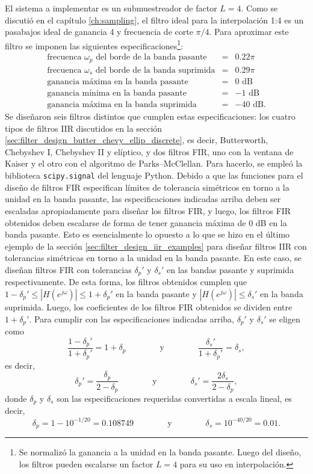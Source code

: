 \documentclass[a4paper]{report}
\begin{document}
El sistema a implementar es un submuestreador de factor \(L=4\). Como se discutió en el capítulo \ref{ch:sampling}, el filtro ideal para la interpolación 1:4 es un pasabajos ideal de ganancia 4 y frecuencia de corte \(\pi/4\). Para aproximar este filtro se imponen las siguientes especificaciones\footnote{Se normalizó la ganancia a la unidad en la banda pasante. Luego del diseño, los filtros pueden escalarse un factor \(L=4\) para su uso en interpolación.}:
\[
 \begin{array}{lclcr}
  \textrm{frecuenca }\omega_p\textrm{ del borde de la banda pasante} & = & 0.22\pi\\
  \textrm{frecuenca }\omega_s\textrm{ del borde de la banda suprimida} & = & 0.29\pi\\
  \textrm{ganancia máxima en la banda pasante} & = & 0\textrm{ dB}\\
  \textrm{ganancia mínima en la banda pasante} & = & -1\textrm{ dB}\\
  \textrm{ganancia máxima en la banda suprimida} & = & -40\textrm{ dB}.
 \end{array}
\]
Se diseñaron seis filtros distintos que cumplen estas especificaciones: los cuatro tipos de filtros IIR discutidos en la sección \ref{sec:filter_design_butter_chevy_ellip_discrete}, es decir, Butterworth, Chebyshev I, Chebyshev II y elíptico, y dos filtros FIR, uno con la ventana de Kaiser y el otro con el algoritmo de Parks--McClellan. Para hacerlo, se empleó la biblioteca \texttt{scipy.signal} del lenguaje Python. Debido a que las funciones para el diseño de filtros FIR especifican límites de tolerancia simétricos en torno a la unidad en la banda pasante, las especificaciones indicadas arriba deben ser escaladas apropiadamente para diseñar los filtros FIR, y luego, los filtros FIR obtenidos deben escalarse de forma de tener ganancia máxima de 0 dB en la banda pasante. Esto es esencialmente lo opuesto a lo que se hizo en el último ejemplo de la sección \ref{sec:filter_design_iir_examples} para diseñar filtros IIR con tolerancias simétricas en torno a la unidad en la banda pasante. En este caso, se diseñan filtros FIR con tolerancias \(\delta_p'\) y \(\delta_s'\) en las bandas pasante y suprimida respectivamente. De esta forma, los filtros obtenidos cumplen que \(1-\delta_p'\leq|H(e^{j\omega})|\leq1+\delta_p'\) en la banda pasante y \(|H(e^{j\omega})|\leq\delta_s'\) en la banda suprimida. Luego, los coeficientes de los filtros FIR obtenidos se dividen entre \(1+\delta_p'\). Para cumplir con las especificaciones indicadas arriba, \(\delta_p'\) y \(\delta_s'\) se eligen como
\[
 \frac{1-\delta_p'}{1+\delta_p'}=1+\delta_p
 \qquad\qquad\textrm{y}\qquad\qquad
 \frac{\delta_s'}{1+\delta_p'}=\delta_s,
\]
es decir,
\[
 \delta_p'=\frac{\delta_p}{2-\delta_p}
 \qquad\qquad\textrm{y}\qquad\qquad
 \delta_s'=\frac{2\delta_s}{2-\delta_p},
\]
donde \(\delta_p\) y \(\delta_s\) son las especificaciones requeridas convertidas a escala lineal, es decir,
\[
 \delta_p=1-10^{-1/20}=0.108749
 \qquad\qquad\textrm{y}\qquad\qquad
 \delta_s=10^{-40/20}=0.01.
\]
\end{document}
